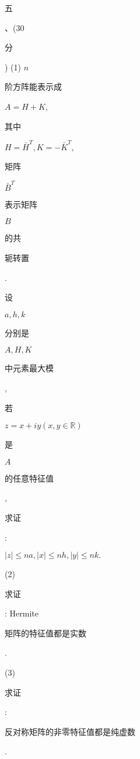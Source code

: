 \documentclass[10pt]{article}
\begin{document}
\begin{CJK}{UTF8}{mj}五\end{CJK}、(30 \begin{CJK}{UTF8}{mj}分\end{CJK}) (1) $n$ \begin{CJK}{UTF8}{mj}阶方阵能表示成\end{CJK} $A=H+K$, \begin{CJK}{UTF8}{mj}其中\end{CJK} $H=\bar{H}^{T}, K=-\bar{K}^{T}$, \begin{CJK}{UTF8}{mj}矩阵\end{CJK} $\bar{B}^{T}$ \begin{CJK}{UTF8}{mj}表示矩阵\end{CJK} $B$ \begin{CJK}{UTF8}{mj}的共\end{CJK} \begin{CJK}{UTF8}{mj}轭转置\end{CJK}. \begin{CJK}{UTF8}{mj}设\end{CJK} $a, h, k$ \begin{CJK}{UTF8}{mj}分别是\end{CJK} $A, H, K$ \begin{CJK}{UTF8}{mj}中元素最大模\end{CJK}, \begin{CJK}{UTF8}{mj}若\end{CJK} $z=x+i y(x, y \in \mathbb{R})$ \begin{CJK}{UTF8}{mj}是\end{CJK} $A$ \begin{CJK}{UTF8}{mj}的任意特征值\end{CJK}, \begin{CJK}{UTF8}{mj}求证\end{CJK}:

$|z| \leq n a,|x| \leq n h,|y| \leq n k .$

(2) \begin{CJK}{UTF8}{mj}求证\end{CJK}: Hermite \begin{CJK}{UTF8}{mj}矩阵的特征值都是实数\end{CJK}.

(3) \begin{CJK}{UTF8}{mj}求证\end{CJK}: \begin{CJK}{UTF8}{mj}反对称矩阵的非零特征值都是纯虚数\end{CJK}.
\end{document}
